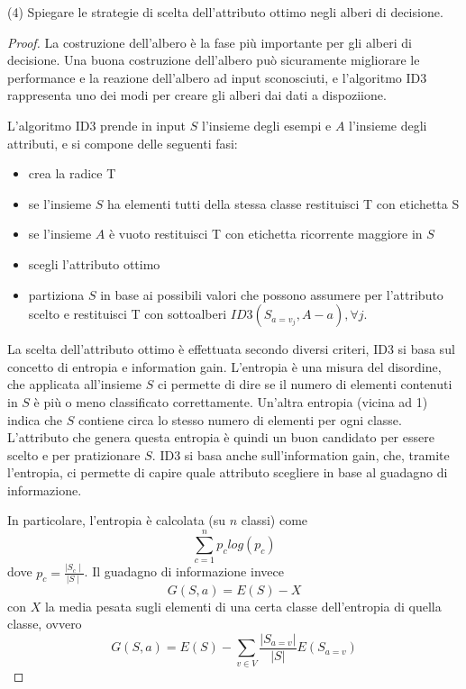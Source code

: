 \documentclass[12pt,a4paper,oneside]{book}
\begin{document}
\begin{exercise}{(4)}
    Spiegare le strategie di scelta dell’attributo ottimo negli alberi
    di decisione.
    
    \begin{proof}
        La costruzione dell'albero è la fase più importante per gli
        alberi di decisione. Una buona costruzione dell'albero può
        sicuramente migliorare le performance e la reazione
        dell'albero ad input sconosciuti, e l'algoritmo ID3
        rappresenta uno dei modi per creare gli alberi dai dati a
        dispoziione.
        
        L'algoritmo ID3 prende in input $S$ l'insieme degli esempi e
        $A$ l'insieme degli attributi, e si compone delle seguenti
        fasi:
        \begin{itemize}
            \item crea la radice T
            \item se l'insieme $S$ ha elementi tutti della stessa
              classe restituisci T con etichetta S
            \item se l'insieme $A$ è vuoto restituisci T con etichetta
              ricorrente maggiore in $S$
            \item scegli l'attributo ottimo
            \item partiziona $S$ in base ai possibili valori che
              possono assumere per l'attributo scelto e restituisci T
              con sottoalberi $ID3(S_{a=v_j}, A-a), \forall j$.
        \end{itemize}
    
        La scelta dell'attributo ottimo è effettuata secondo diversi
        criteri, ID3 si basa sul concetto di entropia e information
        gain. L'entropia è una misura del disordine, che applicata
        all'insieme $S$ ci permette di dire se il numero di elementi
        contenuti in $S$ è più o meno classificato
        correttamente. Un'altra entropia (vicina ad 1) indica che $S$
        contiene circa lo stesso numero di elementi per ogni
        classe. L'attributo che genera questa entropia è quindi un
        buon candidato per essere scelto e per pratizionare $S$. ID3
        si basa anche sull'information gain, che, tramite l'entropia,
        ci permette di capire quale attributo scegliere in base al
        guadagno di informazione.
        
        In particolare, l'entropia è calcolata (su $n$ classi) come
        \[
        \sum_{c=1}^{n} p_c log(p_c)
        \]
        dove $p_c = \frac{\mid S_c\mid}{\mid S \mid}$.
        Il guadagno di informazione invece 
        \[
        G(S, a) = E(S) - X
        \]
        con $X$ la media pesata sugli elementi di una certa classe
        dell'entropia di quella classe, ovvero
        \[
            G(S,a) = E(S) - \sum_{v \in V}\frac{|S_{a=v}|}{|S|} E(S_{a=v})
        \]
        

\end{proof}
\end{exercise}
\end{document}
